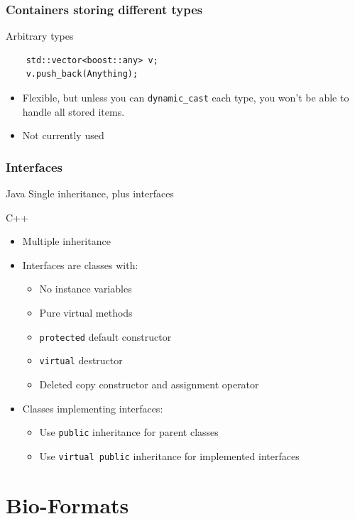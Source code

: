 \documentclass{beamer}
\begin{document}
\begin{frame}[fragile]
  \frametitle{Containers storing different types}
\begin{block}{Arbitrary types}
  \begin{lstlisting}
    std::vector<boost::any> v;
    v.push_back(Anything);
\end{lstlisting}
  \begin{itemize}
  \item Flexible, but unless you can \texttt{dynamic\_cast} each type,
    you won't be able to handle all stored items.
  \item Not currently used
  \end{itemize}
\end{block}
\end{frame}

\begin{frame}[fragile]
  \frametitle{Interfaces}
\begin{block}{Java}
  Single inheritance, plus interfaces
\end{block}
\begin{block}{C++}
  \begin{itemize}
  \item Multiple inheritance
  \item Interfaces are classes with:
    \begin{itemize}
      \item No instance variables
      \item Pure virtual methods
      \item \texttt{protected} default constructor
      \item \texttt{virtual} destructor
      \item Deleted copy constructor and assignment operator
    \end{itemize}
  \item Classes implementing interfaces:
    \begin{itemize}
      \item Use \texttt{public} inheritance for parent classes
      \item Use \texttt{virtual public} inheritance for implemented interfaces
    \end{itemize}
  \end{itemize}
\end{block}
\end{frame}

\section{Bio-Formats}
\end{document}
